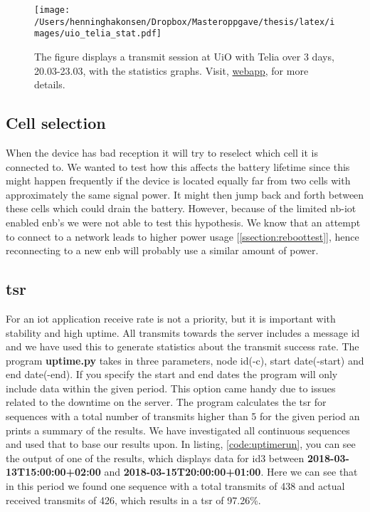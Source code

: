 \documentclass[USenglish]{ifimaster}  %
\begin{document}
\begin{figure}[H]
  \centering
  \texttt{[image: /Users/henninghakonsen/Dropbox/Masteroppgave/thesis/latex/images/uio\_telia\_stat.pdf]}
  \caption[Long-term test - Telia 20.03-23.03, latency and coverage]{The figure displays a transmit session at UiO with Telia over 3 days, 20.03-23.03, with the statistics graphs. Visit, \href{http://158.39.77.97:9000/\#/nodes/id1}{webapp}, for more details.}
  \label{figure:uio_telia_stat}
\end{figure}

\subsection{Cell selection}
When the device has bad reception it will try to reselect which cell it is connected to. We wanted to test how this affects the battery lifetime since this might happen frequently if the device is located equally far from two cells with approximately the same signal power. It might then jump back and forth between these cells which could drain the battery. However, because of the limited \acrshort{nb-iot} enabled \acrshort{enb}'s we were not able to test this hypothesis. We know that an attempt to connect to a network leads to higher power usage [\ref{ssection:reboottest}], hence reconnecting to a new \acrshort{enb} will probably use a similar amount of power.

\subsection{\acrfull{tsr}}
For an \acrshort{iot} application receive rate is not a priority, but it is important with stability and high uptime. All transmits towards the server includes a message id and we have used this to generate statistics about the transmit success rate. The program \textbf{uptime.py} takes in three parameters, node id(-c), start date(-start) and end date(-end). If you specify the start and end dates the program will only include data within the given period. This option came handy due to issues related to the downtime on the server.
The program calculates the \acrshort{tsr} for sequences with a total number of transmits higher than 5 for the given period an prints a summary of the results. We have investigated all continuous sequences and used that to base our results upon. In listing, \vref{code:uptimerun}, you can see the output of one of the results, which displays data for id3 between \textbf{2018-03-13T15:00:00+02:00} and \textbf{2018-03-15T20:00:00+01:00}. Here we can see that in this period we found one sequence with a total transmits of 438 and actual received transmits of 426, which results in a \acrshort{tsr} of 97.26\%.
\end{document}
